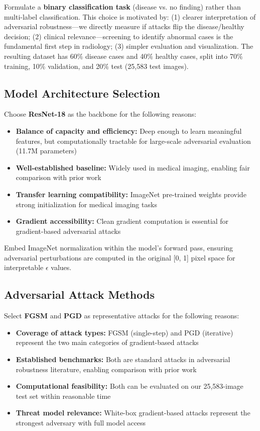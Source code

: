 \documentclass[12pt,a4paper]{article}
\begin{document}
Formulate a \textbf{binary classification task} (disease vs. no finding) rather than multi-label classification. This choice is motivated by: (1) clearer interpretation of adversarial robustness---we directly measure if attacks flip the disease/healthy decision; (2) clinical relevance---screening to identify abnormal cases is the fundamental first step in radiology; (3) simpler evaluation and visualization. The resulting dataset has 60\% disease cases and 40\% healthy cases, split into 70\% training, 10\% validation, and 20\% test (25,583 test images).

\subsection{Model Architecture Selection}

Choose \textbf{ResNet-18} \cite{he2016} as the backbone for the following reasons:
\begin{itemize}[leftmargin=*]
    \item \textbf{Balance of capacity and efficiency:} Deep enough to learn meaningful features, but computationally tractable for large-scale adversarial evaluation (11.7M parameters)
    \item \textbf{Well-established baseline:} Widely used in medical imaging, enabling fair comparison with prior work
    \item \textbf{Transfer learning compatibility:} ImageNet pre-trained weights provide strong initialization for medical imaging tasks
    \item \textbf{Gradient accessibility:} Clean gradient computation is essential for gradient-based adversarial attacks
\end{itemize}

Embed ImageNet normalization within the model's forward pass, ensuring adversarial perturbations are computed in the original [0, 1] pixel space for interpretable $\epsilon$ values.

\subsection{Adversarial Attack Methods}

Select \textbf{FGSM} and \textbf{PGD} as representative attacks for the following reasons:
\begin{itemize}[leftmargin=*]
    \item \textbf{Coverage of attack types:} FGSM (single-step) and PGD (iterative) represent the two main categories of gradient-based attacks
    \item \textbf{Established benchmarks:} Both are standard attacks in adversarial robustness literature, enabling comparison with prior work
    \item \textbf{Computational feasibility:} Both can be evaluated on our 25,583-image test set within reasonable time
    \item \textbf{Threat model relevance:} White-box gradient-based attacks represent the strongest adversary with full model access
\end{itemize}
\end{document}

